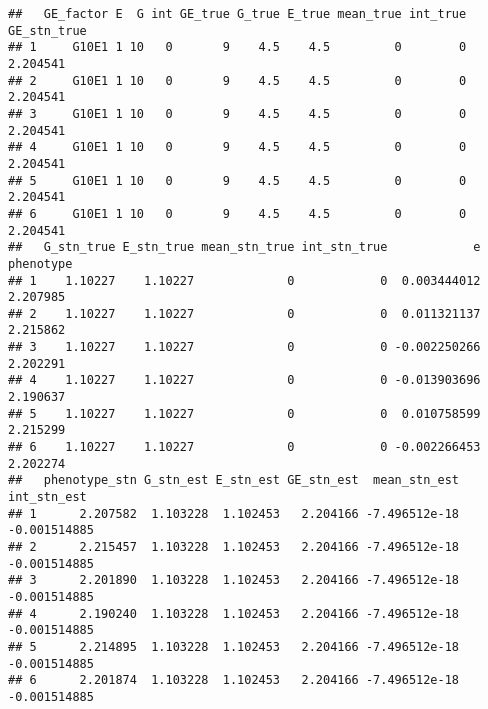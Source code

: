\documentclass[]{article}
\begin{document}
\begin{verbatim}
##   GE_factor E  G int GE_true G_true E_true mean_true int_true GE_stn_true
## 1     G10E1 1 10   0       9    4.5    4.5         0        0    2.204541
## 2     G10E1 1 10   0       9    4.5    4.5         0        0    2.204541
## 3     G10E1 1 10   0       9    4.5    4.5         0        0    2.204541
## 4     G10E1 1 10   0       9    4.5    4.5         0        0    2.204541
## 5     G10E1 1 10   0       9    4.5    4.5         0        0    2.204541
## 6     G10E1 1 10   0       9    4.5    4.5         0        0    2.204541
##   G_stn_true E_stn_true mean_stn_true int_stn_true            e phenotype
## 1    1.10227    1.10227             0            0  0.003444012  2.207985
## 2    1.10227    1.10227             0            0  0.011321137  2.215862
## 3    1.10227    1.10227             0            0 -0.002250266  2.202291
## 4    1.10227    1.10227             0            0 -0.013903696  2.190637
## 5    1.10227    1.10227             0            0  0.010758599  2.215299
## 6    1.10227    1.10227             0            0 -0.002266453  2.202274
##   phenotype_stn G_stn_est E_stn_est GE_stn_est  mean_stn_est  int_stn_est
## 1      2.207582  1.103228  1.102453   2.204166 -7.496512e-18 -0.001514885
## 2      2.215457  1.103228  1.102453   2.204166 -7.496512e-18 -0.001514885
## 3      2.201890  1.103228  1.102453   2.204166 -7.496512e-18 -0.001514885
## 4      2.190240  1.103228  1.102453   2.204166 -7.496512e-18 -0.001514885
## 5      2.214895  1.103228  1.102453   2.204166 -7.496512e-18 -0.001514885
## 6      2.201874  1.103228  1.102453   2.204166 -7.496512e-18 -0.001514885
\end{verbatim}
\end{document}
